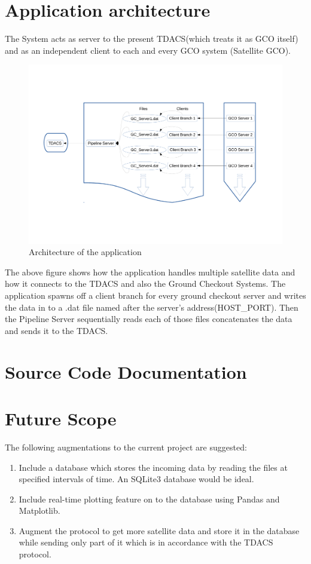 \documentclass[12pt, a4paper]{report}
\begin{document}
\chapter{Application architecture}
The System acts as server to the present TDACS(which treats it as GCO itself)
and as an independent client to each and every GCO system (Satellite GCO).

\begin{figure}[!h]
	\centering
	\includegraphics[scale=0.4]{arch.pdf}
	\caption{Architecture of the application}
\end{figure}

\par The above figure shows how the application handles multiple satellite data
and how it connects to the TDACS and also the Ground Checkout Systems. The
application spawns off a client branch for every ground checkout server and
writes the data in to a .dat file named after the server's address(HOST\_PORT).
Then the Pipeline Server sequentially reads each of those files concatenates
the data and sends it to the TDACS.

\chapter{Source Code Documentation}



\chapter{Future Scope}
\par The following augmentations to the current project are suggested:
\begin{enumerate}
	\item Include a database which stores the incoming data by reading the
		files at specified intervals of time. An SQLite3 database would be
		ideal.
	\item Include real-time plotting feature on to the database using Pandas
		and Matplotlib.
	\item Augment the protocol to get more satellite data and store it in the
		database while sending only part of it which is in accordance with the
		TDACS protocol.
\end{enumerate}
\end{document}
